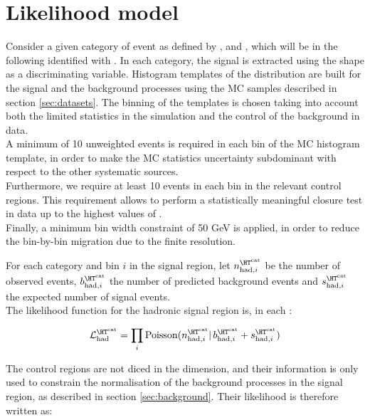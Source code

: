 \section{Likelihood model}
\label{sec:likelihood}

Consider a given category of event as defined by \njet, \nb and \HT, which will be in the following identified with \htcat. 
In each category, the signal is extracted using the \mht shape as a discriminating variable. 
Histogram templates of the \mht distribution are built for the signal and the background processes 
using the MC samples described in section \ref{sec:datasets}. 
The binning of the templates is chosen taking into account both the limited statistics in the simulation and 
the control of the background in data. \\
A minimum of 10 unweighted events is required in each bin of the MC histogram template, 
in order to make the MC statistics uncertainty subdominant with respect to the other systematic sources. \\
Furthermore, we require at least 10 events in each bin in the relevant control regions. 
This requirement allows to perform a statistically meaningful closure test in data up to the highest values of \mht.\\
Finally, a minimum bin width constraint of 50 GeV is applied, 
in order to reduce the bin-by-bin migration due to the finite \mht resolution.

For each category \htcat and \mht bin $i$ in the signal region, let $n^{\htcat}_{\mathrm{had},i}$ be the number of observed events, $b^{\htcat}_{\mathrm{had},i}$ the number of predicted background events and $s^{\htcat}_{\mathrm{had},i}$ the expected number of signal events. \\
The likelihood function for the hadronic signal region is, in each \htcat:

\begin{equation}
\mathcal{L}^{\htcat}_{\mathrm{had}}=\prod_i \mathrm{Poisson}(n^{\htcat}_{\mathrm{had},i} |\, b^{\htcat}_{\mathrm{had},i} + s^{\htcat}_{\mathrm{had},i})
\label{eq:hadronicLikelihood}
\end{equation}

The control regions are not diced in the \mht dimension, and their information is only used to constrain the normalisation of the background processes 
in the signal region, as described in section \ref{sec:background}. 
Their likelihood is therefore written as:

